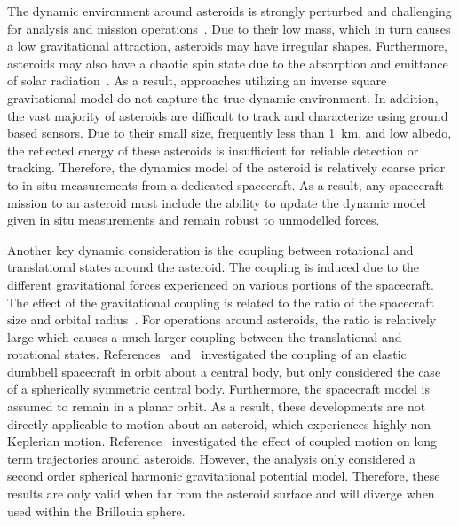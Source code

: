 \documentclass[letterpaper, paper,11pt]{AAS}		%
\begin{document}
The dynamic environment around asteroids is strongly perturbed and challenging for analysis and mission operations~\cite{scheeres2012}.
Due to their low mass, which in turn causes a low gravitational attraction, asteroids may have irregular shapes.
Furthermore, asteroids may also have a chaotic spin state due to the absorption and emittance of solar radiation~\cite{rubincam2000}.
As a result, approaches utilizing an inverse square gravitational model do not capture the  true dynamic environment.
In addition, the vast majority of asteroids are difficult to track and characterize using ground based sensors.
Due to their small size, frequently less than \SI{1}{\kilo\meter}, and low albedo, the reflected energy of these asteroids is insufficient for reliable detection or tracking.
Therefore, the dynamics model of the asteroid is relatively coarse prior to in situ measurements from a dedicated spacecraft.
As a result, any spacecraft mission to an asteroid must include the ability to update the dynamic model given in situ measurements and remain robust to unmodelled forces.

Another key dynamic consideration is the coupling between rotational and translational states around the asteroid.
The coupling is induced due to the different gravitational forces experienced on various portions of the spacecraft. 
The effect of the gravitational coupling is related to the ratio of the spacecraft size and orbital radius~\cite{hughes2004}.
For operations around asteroids, the ratio is relatively large which causes a much larger coupling between the translational and rotational states.
References~ and~ investigated the coupling of an elastic dumbbell spacecraft in orbit about a central body, but only considered the case of a spherically symmetric central body.
Furthermore, the spacecraft model is assumed to remain in a planar orbit.
As a result, these developments are not directly applicable to motion about an asteroid, which experiences highly non-Keplerian motion.
Reference~ investigated the effect of coupled motion on long term trajectories around asteroids.
However, the analysis only considered a second order spherical harmonic gravitational potential model. 
Therefore, these results are only valid when far from the asteroid surface and will diverge when used within the Brillouin sphere.
\end{document}

